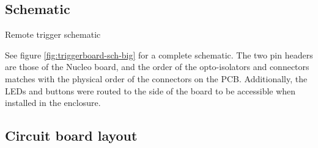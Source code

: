 \subsection{Schematic} \label{app:fullschematic}

{Remote trigger schematic}

See figure \ref{fig:triggerboard-sch-big} for a complete schematic.
The two pin headers are those of the Nucleo board, and the order of the opto-isolators and connectors matches with the physical order of the connectors on the PCB.
Additionally, the LEDs and buttons were routed to the side of the board to be accessible when installed in the enclosure.

\subsection{Circuit board layout}

